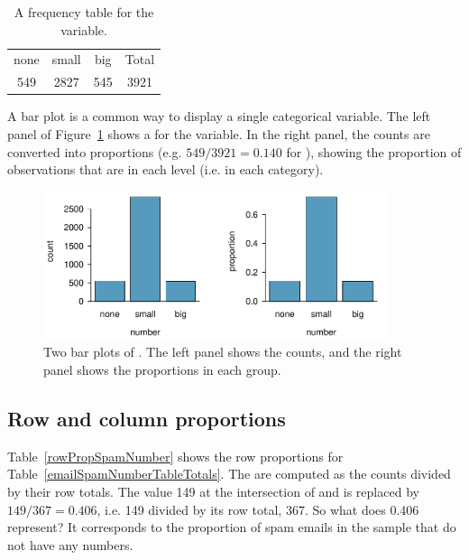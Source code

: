 \begin{table}[htb]
\centering
\begin{tabular}{cccc}
  \hline
none & small & big & Total \\ 
 549 & 2827 & 545 & 3921 \\
   \hline
\end{tabular}
\caption{A frequency table for the  variable.}
\label{emailNumberTable}
\end{table}

A bar plot is a common way to display a single categorical variable. The left panel of Figure~\ref{emailNumberBarPlot} shows a  for the  variable. In the right panel, the counts are converted into proportions (e.g. $549/3921=0.140$ for ), showing the proportion of observations that are in each level (i.e. in each category).

\begin{figure}[bht]
   \centering
   \includegraphics[width=0.9\textwidth]{ch_intro_to_data/figures/emailNumberBarPlot/emailNumberBarPlot}
   \caption{Two bar plots of . The left panel shows the counts, and the right panel shows the proportions in each group.}
   \label{emailNumberBarPlot}
\end{figure}


\subsection{Row and column proportions}

Table~\ref{rowPropSpamNumber} shows the row proportions for Table~\ref{emailSpamNumberTableTotals}. The  are computed as the counts divided by their row totals. The value 149 at the intersection of  and  is replaced by $149/367=0.406$, i.e. 149 divided by its row total, 367. So what does 0.406 represent? It corresponds to the proportion of spam emails in the sample that do not have any numbers.

